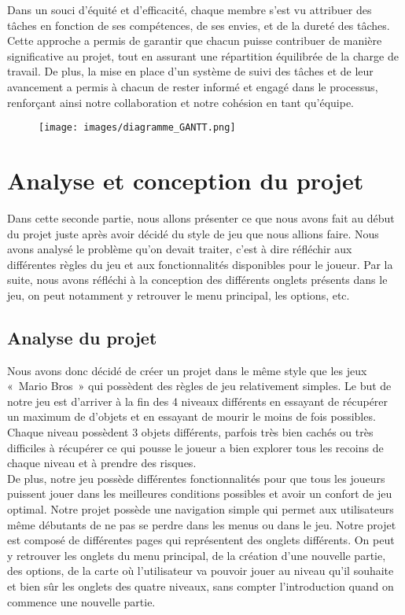 \documentclass[12pt,a4paper]{article}
\begin{document}
            Dans un souci d'équité et d'efficacité, chaque membre s'est vu attribuer des tâches en fonction de ses compétences, de ses envies, et de la dureté des tâches. Cette approche a permis de garantir que chacun puisse contribuer de manière significative au projet, tout en assurant une répartition équilibrée de la charge de travail. De plus, la mise en place d'un système de suivi des tâches et de leur avancement a permis à chacun de rester informé et engagé dans le processus, renforçant ainsi notre collaboration et notre cohésion en tant qu'équipe.\\

            \begin{figure}[h]
                \centering
                \texttt{[image: images/diagramme\_GANTT.png]}\\
            \end{figure}

    \newpage
    
    \section{Analyse et conception du projet}
        \tabto{1cm} Dans cette seconde partie, nous allons présenter ce que nous avons fait au début du projet juste après avoir décidé du style de jeu que nous allions faire. Nous avons analysé le problème qu'on devait traiter, c'est à dire réfléchir aux différentes règles du jeu et aux fonctionnalités disponibles pour le joueur. Par la suite, nous avons réfléchi à la conception des différents onglets présents dans le jeu, on peut notamment y retrouver le menu principal, les options, etc.

        \subsection{Analyse du projet}
            \tabto{1cm} Nous avons donc décidé de créer un projet dans le même style que les jeux «~Mario Bros~» qui possèdent des règles de jeu relativement simples. Le but de notre jeu est d’arriver à la fin des 4 niveaux différents en essayant de récupérer un maximum de d’objets et en essayant de mourir le moins de fois possibles. Chaque niveau possèdent 3 objets différents, parfois très bien cachés ou très difficiles à récupérer ce qui pousse le joueur a bien explorer tous les recoins de chaque niveau et à prendre des risques.\\

            \tabto{1cm} De plus, notre jeu possède différentes fonctionnalités pour que tous les joueurs puissent jouer dans les meilleures conditions possibles et avoir un confort de jeu optimal. Notre projet possède une navigation simple qui permet aux utilisateurs même débutants de ne pas se perdre dans les menus ou dans le jeu. Notre projet est composé de différentes pages qui représentent des onglets différents. On peut y retrouver les onglets du menu principal, de la création d’une nouvelle partie, des options, de la carte où l'utilisateur va pouvoir jouer au niveau qu'il souhaite et bien sûr les onglets des quatre niveaux, sans compter l’introduction quand on commence une nouvelle partie.
\end{document}
